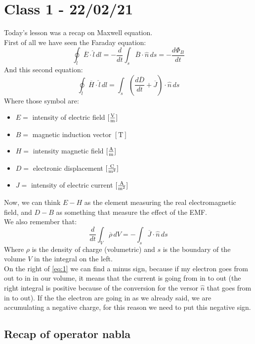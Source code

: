 \section{Class 1 - 22/02/21}
Today's lesson was a recap on Maxwell equation.\\
First of all we have seen the Faraday equation:
\begin{equation}\label{eq:first_maxwell}
 \oint_l \overline{E} \cdot \hat{l} \, dl = -\frac{d}{dt}\int_s \overline{B} \cdot \hat{n} \, ds = - \frac{d\Phi_B}{dt}
\end{equation}
And this second equation:
\begin{equation}
\oint_l \overline{H}\cdot \hat{l} \, dl = \int_s \left(\frac{d\overline{D}}{dt}+\overline{J}\right)\cdot \hat{n}\,ds
\end{equation}
Where those symbol are:
\begin{itemize}
\item $E=$ intensity of electric field $[\si{\frac{\volt}{\metre}}]$
\item $B=$ magnetic induction vector $[\si{\tesla}]$
\item $H=$ intensity magnetic field $[\si{\frac{\ampere}{\metre}}]$
\item $D=$ electronic displacement $[\si{\frac{\coulomb}{\metre^2}}]$
\item $J=$ intensity of electric current $[\si{\frac{\ampere}{\metre^2}}]$
\end{itemize}
Now, we can think $E - H$ as the element measuring the real electromagnetic field, and $D - B$ as something that measure the effect of the EMF.\\
We also remember that:
\begin{equation}\label{eq:1}
\frac{d}{dt}\int_V \overline{\rho} \, dV=-\int_s \overline{J}\cdot \hat{n}\,ds
\end{equation}
Where $\rho$ is the density of charge (volumetric) and $s$ is the boundary of the volume $V$ in the integral on the left.\\
On the right of \cref{eq:1} we can find a minus sign, because if my electron goes from out to in in our volume, it means that the current is going from in to out (the right integral is positive because of the conversion for the versor $\hat{n}$ that goes from in to out). If the the electron are going in as we already said, we are accumulating a negative charge, for this reason we need to put this negative sign.
\subsection*{Recap of operator nabla}
